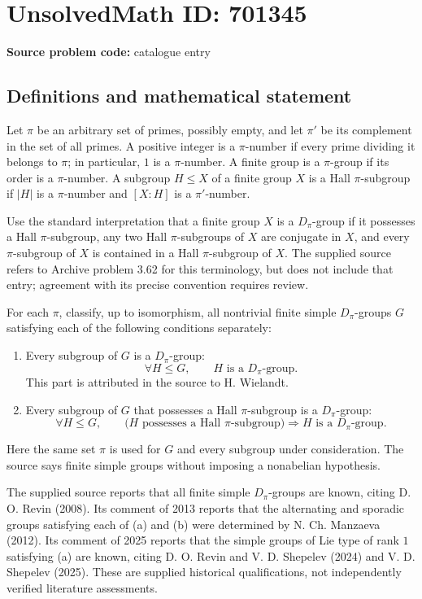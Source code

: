 \documentclass[11pt]{article}
\begin{document}
\section*{UnsolvedMath ID: 701345}
\textbf{Source problem code:} catalogue entry
\subsection{Definitions and mathematical statement}
Let \(\pi\) be an arbitrary set of primes, possibly empty, and let \(\pi'\) be its complement in the set of all primes. A positive integer is a \(\pi\)-number if every prime dividing it belongs to \(\pi\); in particular, \(1\) is a \(\pi\)-number. A finite group is a \(\pi\)-group if its order is a \(\pi\)-number. A subgroup \(H\leq X\) of a finite group \(X\) is a Hall \(\pi\)-subgroup if \(|H|\) is a \(\pi\)-number and \([X:H]\) is a \(\pi'\)-number.

Use the standard interpretation that a finite group \(X\) is a \(D_\pi\)-group if it possesses a Hall \(\pi\)-subgroup, any two Hall \(\pi\)-subgroups of \(X\) are conjugate in \(X\), and every \(\pi\)-subgroup of \(X\) is contained in a Hall \(\pi\)-subgroup of \(X\). The supplied source refers to Archive problem 3.62 for this terminology, but does not include that entry; agreement with its precise convention requires review.

For each \(\pi\), classify, up to isomorphism, all nontrivial finite simple \(D_\pi\)-groups \(G\) satisfying each of the following conditions separately:
\begin{enumerate}
\item[(a)] Every subgroup of \(G\) is a \(D_\pi\)-group:
\[
\forall H\leq G,\qquad H\text{ is a }D_\pi\text{-group}.
\]
This part is attributed in the source to H. Wielandt.
\item[(b)] Every subgroup of \(G\) that possesses a Hall \(\pi\)-subgroup is a \(D_\pi\)-group:
\[
\forall H\leq G,\qquad
\bigl(H\text{ possesses a Hall }\pi\text{-subgroup}\bigr)
\Longrightarrow H\text{ is a }D_\pi\text{-group}.
\]
\end{enumerate}
Here the same set \(\pi\) is used for \(G\) and every subgroup under consideration. The source says finite simple groups without imposing a nonabelian hypothesis.

The supplied source reports that all finite simple \(D_\pi\)-groups are known, citing D. O. Revin (2008). Its comment of 2013 reports that the alternating and sporadic groups satisfying each of (a) and (b) were determined by N. Ch. Manzaeva (2012). Its comment of 2025 reports that the simple groups of Lie type of rank \(1\) satisfying (a) are known, citing D. O. Revin and V. D. Shepelev (2024) and V. D. Shepelev (2025). These are supplied historical qualifications, not independently verified literature assessments.
\end{document}
